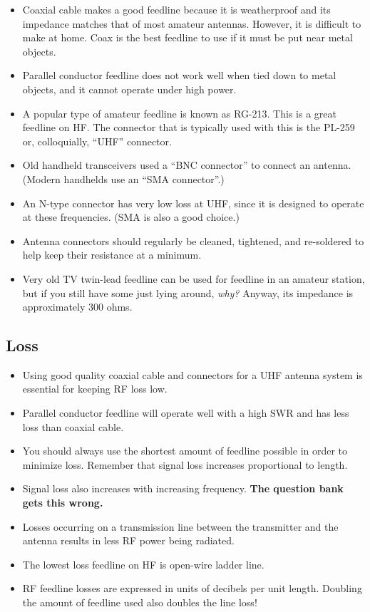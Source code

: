 \documentclass[letterpaper,12pt]{scrartcl}
\begin{document}
\begin{itemize}
\item Coaxial cable makes a good feedline because it is weatherproof and its impedance matches that of most amateur antennas. However, it is difficult to make at home.
Coax is the best feedline to use if it must be put near metal objects. 
\item Parallel conductor feedline does not work well when tied down to metal objects, and it cannot operate under high power. 
\item A popular type of amateur feedline is known as RG-213.
This is a great feedline on HF.
 The connector that is typically used with this is the PL-259 or, colloquially, ``UHF'' connector.
\item Old handheld transceivers used a ``BNC connector'' to connect an antenna. (Modern handhelds use an ``SMA connector''.)
\item An N-type connector has very low loss at UHF, since it is designed to operate at these frequencies. (SMA is also a good choice.)
\item Antenna connectors should regularly be cleaned, tightened, and re-soldered to help keep their resistance at a minimum.
\item Very old TV twin-lead feedline can be used for feedline in an amateur station, but if you still have some just lying around, \textit{why?}
Anyway, its impedance is approximately 300 ohms.
\end{itemize}

\subsection{Loss}

\begin{itemize}
\item Using good quality coaxial cable and connectors for a UHF antenna system is essential for keeping RF loss low.
\item Parallel conductor feedline will operate well with a high SWR and has less loss than coaxial cable.
\item You should always use the shortest amount of feedline possible in order to minimize loss. Remember that
signal loss increases proportional to length.
\item Signal loss also increases with increasing frequency. \textbf{The question bank gets this wrong.} 
\item Losses occurring on a transmission line between the transmitter and the antenna results in less RF power being radiated.
\item The lowest loss feedline on HF is open-wire ladder line.
\item RF feedline losses are expressed in units of decibels per unit length.
Doubling the amount of feedline used also doubles the line loss!
\end{itemize}
\end{document}
